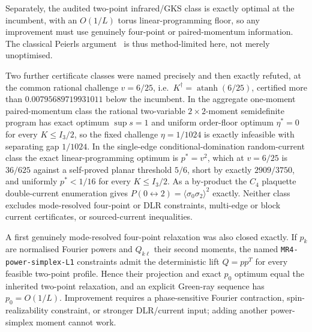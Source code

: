\documentclass[11pt]{article}
\theoremstyle{definition}
\begin{document}
Separately, the audited two-point infrared/GKS class is exactly optimal at the incumbent, with an
$O(1/L)$ torus linear-programming floor, so any improvement must use genuinely four-point or
paired-momentum information. The classical Peierls argument~\cite{peierls1936_ising,%
griffiths1964_peierls,friedli_velenik2017_ising_ch3} is thus method-limited here, not merely
unoptimised.

Two further certificate classes were named precisely and then exactly refuted, at the common rational
challenge $v=6/25$, i.e.\ $K^\dagger=\operatorname{atanh}(6/25)$, certified more than
$0.00795689719931011$ below the incumbent. In the aggregate one-moment paired-momentum class the
rational two-variable $2\times2$-moment semidefinite program has exact optimum $\sup s=1$ and uniform
order-floor optimum $\eta^*=0$ for every $K\le I_3/2$, so the fixed challenge $\eta=1/1024$ is exactly
infeasible with separating gap $1/1024$. In the single-edge conditional-domination random-current
class the exact linear-programming optimum is $p^*=v^2$, which at $v=6/25$ is $36/625$ against a
self-proved planar threshold $5/6$, short by exactly $2909/3750$, and uniformly $p^*<1/16$ for every
$K\le I_3/2$. As a by-product the $C_4$ plaquette double-current enumeration gives
$P(0\leftrightarrow2)=\langle\sigma_0\sigma_2\rangle^2$ exactly. Neither class excludes mode-resolved
four-point or DLR constraints, multi-edge or block current certificates, or sourced-current
inequalities.

A first genuinely mode-resolved four-point relaxation was also closed exactly. If $p_k$ are
normalised Fourier powers and $Q_{k\ell}$ their second moments, the named
\texttt{MR4-power-simplex-L1} constraints admit the deterministic lift $Q=pp^T$ for every feasible
two-point profile. Hence their projection and exact $p_0$ optimum equal the inherited two-point
relaxation, and an explicit Green-ray sequence has $p_0=O(1/L)$. Improvement requires a
phase-sensitive Fourier contraction, spin-realizability constraint, or stronger DLR/current input;
adding another power-simplex moment cannot work.
\end{document}
